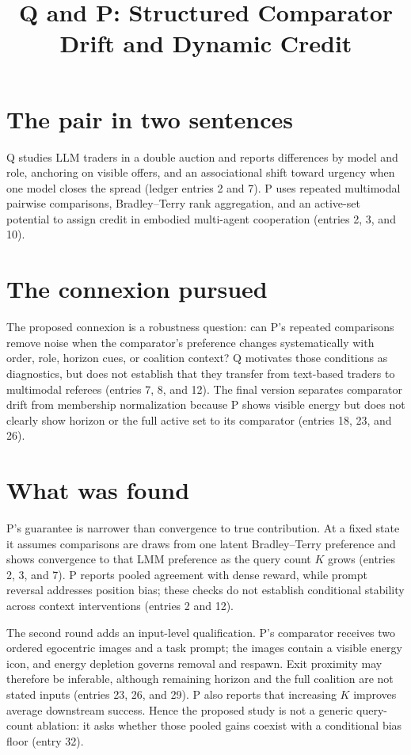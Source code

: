 \documentclass{article}
\title{Q and P: Structured Comparator Drift and Dynamic Credit}
\author{}
\date{}
\begin{document}
\maketitle

\section*{The pair in two sentences}
Q studies LLM traders in a double auction and reports differences by model and
role, anchoring on visible offers, and an associational shift toward urgency when
one model closes the spread (ledger entries 2 and 7). P uses repeated multimodal
pairwise comparisons, Bradley--Terry rank aggregation, and an active-set
potential to assign credit in embodied multi-agent cooperation (entries 2, 3,
and 10).

\section*{The connexion pursued}
The proposed connexion is a robustness question: can P's repeated comparisons
remove noise when the comparator's preference changes systematically with order,
role, horizon cues, or coalition context? Q motivates those conditions as
diagnostics, but does not establish that they transfer from text-based traders
to multimodal referees (entries 7, 8, and 12). The final version separates
comparator drift from membership normalization because P shows visible energy
but does not clearly show horizon or the full active set to its comparator
(entries 18, 23, and 26).

\section*{What was found}
P's guarantee is narrower than convergence to true contribution. At a fixed
state it assumes comparisons are draws from one latent Bradley--Terry preference
and shows convergence to that LMM preference as the query count $K$ grows
(entries 2, 3, and 7). P reports pooled agreement with dense reward, while
prompt reversal addresses position bias; these checks do not establish
conditional stability across context interventions (entries 2 and 12).

The second round adds an input-level qualification. P's comparator receives two
ordered egocentric images and a task prompt; the images contain a visible energy
icon, and energy depletion governs removal and respawn. Exit proximity may
therefore be inferable, although remaining horizon and the full coalition are
not stated inputs (entries 23, 26, and 29). P also reports that increasing $K$
improves average downstream success. Hence the proposed study is not a generic
query-count ablation: it asks whether those pooled gains coexist with a
conditional bias floor (entry 32).
\end{document}

